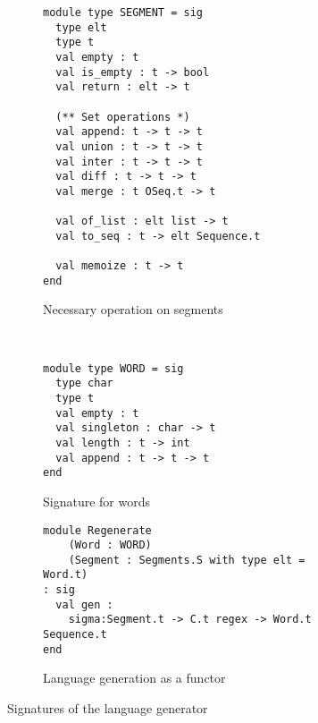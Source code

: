 \begin{figure}[h]
  \centering
  \begin{subfigure}{0.44\linewidth}
\begin{lstlisting}
module type SEGMENT = sig
  type elt
  type t
  val empty : t
  val is_empty : t -> bool
  val return : elt -> t

  (** Set operations *)
  val append: t -> t -> t
  val union : t -> t -> t
  val inter : t -> t -> t
  val diff : t -> t -> t
  val merge : t OSeq.t -> t

  val of_list : elt list -> t
  val to_seq : t -> elt Sequence.t

  val memoize : t -> t
end
\end{lstlisting}
    \caption{Necessary operation on segments}
    \label{code:sigs:segment}
  \end{subfigure}~
  \begin{subfigure}{0.57\linewidth}
\begin{lstlisting}
module type WORD = sig
  type char
  type t
  val empty : t
  val singleton : char -> t
  val length : t -> int
  val append : t -> t -> t
end
\end{lstlisting}
    \caption{Signature for words}
    \label{code:sigs:word}
\begin{lstlisting}
module Regenerate
    (Word : WORD)
    (Segment : Segments.S with type elt = Word.t)
: sig
  val gen : 
    sigma:Segment.t -> C.t regex -> Word.t Sequence.t
end
\end{lstlisting}
    \caption{Language generation as a functor}
    \label{code:sigs:regen}
  \end{subfigure}
  \caption{Signatures of the language generator}
  \label{code:sigs}
\end{figure}

